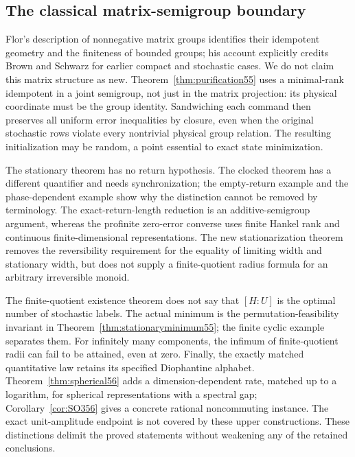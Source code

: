\subsection{The classical matrix-semigroup boundary}
Flor's description of nonnegative matrix groups \cite[Theorems 2 and 3]{Flor} identifies their idempotent geometry and the finiteness of bounded groups; his account explicitly credits Brown and Schwarz for earlier compact and stochastic cases. We do not claim this matrix structure as new. Theorem~\ref{thm:purification55} uses a minimal-rank idempotent in a joint semigroup, not just in the matrix projection: its physical coordinate must be the group identity. Sandwiching each command then preserves all uniform error inequalities by closure, even when the original stochastic rows violate every nontrivial physical group relation. The resulting initialization may be random, a point essential to exact state minimization.

The stationary theorem has no return hypothesis. The clocked theorem has a different quantifier and needs synchronization; the empty-return example and the phase-dependent example show why the distinction cannot be removed by terminology. The exact-return-length reduction is an additive-semigroup argument, whereas the profinite zero-error converse uses finite Hankel rank and continuous finite-dimensional representations. The new stationarization theorem removes the reversibility requirement for the equality of limiting width and stationary width, but does not supply a finite-quotient radius formula for an arbitrary irreversible monoid.

The finite-quotient existence theorem does not say that $[H:U]$ is the optimal number of stochastic labels. The actual minimum is the permutation-feasibility invariant in Theorem~\ref{thm:stationaryminimum55}; the finite cyclic example separates them. For infinitely many components, the infimum of finite-quotient radii can fail to be attained, even at zero. Finally, the exactly matched quantitative law retains its specified Diophantine alphabet. Theorem~\ref{thm:spherical56} adds a dimension-dependent rate, matched up to a logarithm, for spherical representations with a spectral gap; Corollary~\ref{cor:SO356} gives a concrete rational noncommuting instance. The exact unit-amplitude endpoint is not covered by these upper constructions. These distinctions delimit the proved statements without weakening any of the retained conclusions.


